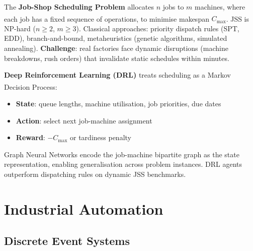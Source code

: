 \begin{tcbitemize}[ skin=sectionraster ]
    \tcbitem[title={Job-Shop Scheduling (JSS)}, raster multicolumn=3]
    The \textbf{Job-Shop Scheduling Problem} allocates $n$ jobs to $m$ machines, where each job has a fixed sequence of operations, to minimise makespan $C_{\max}$\textsuperscript{\cite[][pp.~1--5]{panJobShopSchedulingRL2021}}.
    JSS is NP-hard ($n \geq 2$, $m \geq 3$).
    Classical approaches: priority dispatch rules (SPT, EDD), branch-and-bound, metaheuristics (genetic algorithms, simulated annealing).
    \textbf{Challenge}: real factories face dynamic disruptions (machine breakdowns, rush orders) that invalidate static schedules within minutes.

    \tcbitem[title={RL for Dynamic Scheduling}, raster multicolumn=3]
    \textbf{Deep Reinforcement Learning (DRL)} treats scheduling as a Markov Decision Process\textsuperscript{\cite[][pp.~3--6]{panJobShopSchedulingRL2021}}:
    \begin{itemize}
        \item \textbf{State}: queue lengths, machine utilisation, job priorities, due dates
        \item \textbf{Action}: select next job-machine assignment
        \item \textbf{Reward}: $-C_{\max}$ or tardiness penalty
    \end{itemize}
    Graph Neural Networks encode the job-machine bipartite graph as the state representation, enabling generalisation across problem instances.
    DRL agents outperform dispatching rules on dynamic JSS benchmarks.
\end{tcbitemize}

\section{Industrial Automation}

\subsection{Discrete Event Systems}

